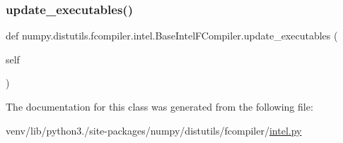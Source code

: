 \subsubsection{\texorpdfstring{update\+\_\+executables()}{update\_executables()}}
{\footnotesize\ttfamily def numpy.\+distutils.\+fcompiler.\+intel.\+Base\+Intel\+F\+Compiler.\+update\+\_\+executables (\begin{DoxyParamCaption}\item[{}]{self }\end{DoxyParamCaption})}



The documentation for this class was generated from the following file\+:\begin{DoxyCompactItemize}
\item 
venv/lib/python3./site-\/packages/numpy/distutils/fcompiler/\hyperlink{intel_8py}{intel.\+py}\end{DoxyCompactItemize}
